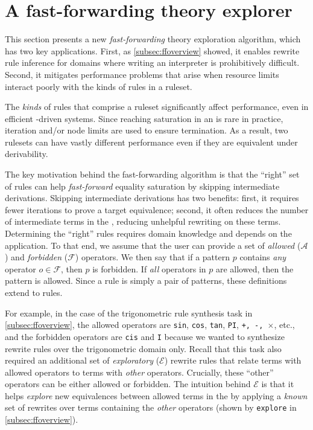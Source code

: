 \section{A fast-forwarding theory explorer}
\label{sec:lift}
\label{subsec:ff-nointerp}
\label{subsec:perf}

This section presents a new
  \textit{fast-forwarding} theory exploration
  algorithm, which has two key applications.
First, as \autoref{subsec:ffoverview} showed,
  it enables rewrite rule inference
  for domains where writing an interpreter
  is prohibitively difficult.
Second,
  it mitigates performance problems that arise
  when resource limits interact poorly with
  the kinds of rules in a ruleset.

The \textit{kinds} of rules that comprise a ruleset
  significantly affect performance,
  even in efficient \eqsat-driven systems.
Since reaching saturation
  in an \egraph is rare in practice,
  iteration and/or node limits are used
  to ensure termination.
As a result,
  two rulesets can have vastly different
  performance
  even if they are equivalent under derivability.

The key motivation behind
  the fast-forwarding algorithm is that
  the ``right'' set of rules
  can help \textit{fast-forward} equality saturation by
  skipping intermediate derivations.
Skipping intermediate derivations has two benefits:
  first, it requires fewer iterations to prove
  a target equivalence;
  second, it often
  reduces the number of intermediate terms in the \egraph,
  reducing unhelpful rewriting on these terms.
Determining the ``right'' rules requires domain knowledge
  and depends on the application.
To that end, we assume that the user can provide
  a set of \textit{allowed} ($\mathcal{A}$) and
  \textit{forbidden} ($\mathcal{F}$) operators.
We then say that
  if a pattern $p$ contains \textit{any} operator $o \in \mathcal{F}$,
  then $p$ is forbidden.
If \textit{all} operators in $p$ are allowed,
  then the pattern is allowed.
Since a rule is simply a pair
  of patterns,
  these definitions extend to rules.

For example, in the case of the trigonometric
  rule synthesis task in \autoref{subsec:ffoverview},
  the allowed operators are \texttt{sin}, \texttt{cos}, \texttt{tan},
  \texttt{PI}, \texttt{+, -, $\times$}, etc., and
  the forbidden operators are
  \texttt{cis} and \texttt{I} because we wanted \enumo to synthesize
  rewrite rules over the trigonometric domain only.
Recall that this task also required an additional set of
  \textit{exploratory} ($\mathcal{E}$) rewrite rules that relate
  terms with allowed operators to terms with \emph{other} operators.
Crucially, these ``other'' operators can be either allowed or
  forbidden.
The intuition behind $\mathcal{E}$
  is that it helps \textit{explore}
  new equivalences between allowed terms in the \egraph by
  applying a \textit{known} set of rewrites over terms containing the
  \emph{other} operators
  (shown by \texttt{explore} in \autoref{subsec:ffoverview}).

